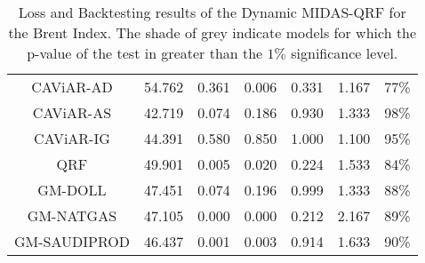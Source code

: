 \begin{table}[H]
\begin{tabular}{ccccccc}
CAViAR-AD                       & 54.762 & 0.361    & 0.006    & 0.331    & 1.167 & 77\%   \\
\rowcolor[HTML]{D9D9D9} CAViAR-AS                       & 42.719 & 0.074    & 0.186    & 0.930    & 1.333 & 98\%   \\
\rowcolor[HTML]{D9D9D9} 
CAViAR-IG                       & 44.391 & 0.580    & 0.850    & 1.000    & 1.100 & 95\%   \\
QRF                             & 49.901 & 0.005    & 0.020    & 0.224    & 1.533 & 84\%   \\
\rowcolor[HTML]{D9D9D9} 
\cellcolor[HTML]{D9D9D9}GM-DOLL & 47.451 & 0.074    & 0.196    & 0.999    & 1.333 & 88\%   \\
GM-NATGAS                       & 47.105 & 0.000    & 0.000    & 0.212    & 2.167 & 89\%   \\
GM-SAUDIPROD                   & 46.437 & 0.001    & 0.003    & 0.914    & 1.633 & 90\%   \\ \hline
\end{tabular}
\caption{Loss and Backtesting results of the Dynamic MIDAS-QRF for the Brent Index.  The shade of grey indicate models for which the p-value of the test in greater than the $1\%$ significance level.}
\label{tab:brent-dyn}
\end{table}